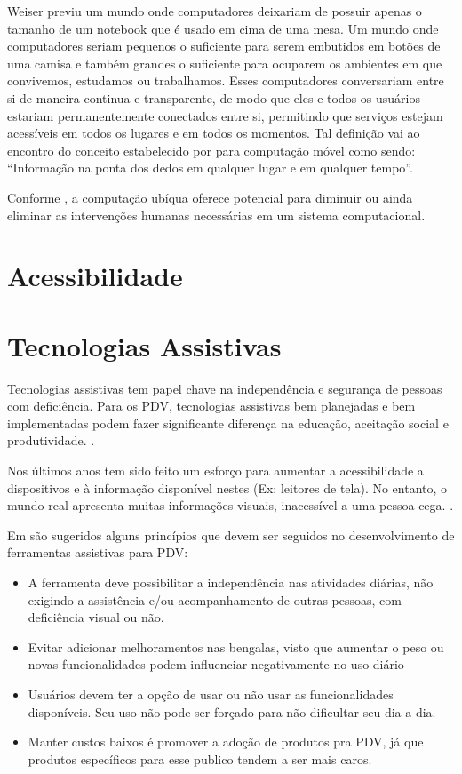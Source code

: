 \documentclass[english,brazilian]{UNISINOSmonografia}
\begin{document}
Weiser previu um mundo onde computadores deixariam de possuir apenas o tamanho de um notebook que é usado em cima de uma mesa. Um mundo onde computadores seriam pequenos o suficiente para serem embutidos em botões de uma camisa e também grandes o suficiente para ocuparem os ambientes em que convivemos, estudamos ou trabalhamos. Esses computadores conversariam entre si de maneira continua e transparente, de modo que eles e todos os usuários estariam permanentemente conectados entre si, permitindo que serviços estejam acessíveis em todos os lugares e em todos os momentos. Tal definição vai ao encontro do conceito estabelecido por  para computação móvel como sendo: “Informação na ponta dos dedos em qualquer lugar e em qualquer tempo”.

Conforme , a computação ubíqua oferece potencial para diminuir ou ainda eliminar as intervenções humanas necessárias em um sistema computacional.
	
	\section{Acessibilidade}

	\section{Tecnologias Assistivas}
Tecnologias assistivas tem papel chave na independência e segurança de pessoas com deficiência. Para os PDV, tecnologias assistivas bem planejadas e bem implementadas podem fazer significante diferença na educação, aceitação social e produtividade. \cite{dias2015navpal}.

Nos últimos anos tem sido feito um esforço para aumentar a acessibilidade a dispositivos e à informação disponível nestes (Ex: leitores de tela). No entanto, o mundo real apresenta muitas informações visuais, inacessível a uma pessoa cega. \cite{ucat2014}.

Em  são sugeridos alguns princípios que devem ser seguidos no desenvolvimento de ferramentas assistivas para PDV:
\begin{itemize}
	\item A ferramenta deve possibilitar a independência nas atividades diárias, não exigindo a assistência e/ou acompanhamento de outras pessoas, com deficiência visual ou não.
	\item Evitar adicionar melhoramentos nas bengalas, visto que aumentar o peso ou novas funcionalidades podem influenciar negativamente no uso diário
	\item Usuários devem ter a opção de usar ou não usar as funcionalidades disponíveis. Seu uso não pode ser forçado para não dificultar seu dia-a-dia.
	\item Manter custos baixos é promover a adoção de produtos pra PDV, já que produtos específicos para esse publico tendem a ser mais caros.
\end{itemize}
\end{document}
